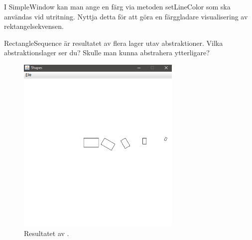 \Subtask I SimpleWindow kan man ange en färg via metoden setLineColor som ska användas vid utritning. Nyttja detta för att göra en färggladare visualisering av rektangelsekvensen.

\Subtask RectangleSequence är resultatet av flera lager utav abstraktioner. Vilka abstraktionslager ser du? Skulle man kunna abstrahera ytterligare?



\begin{figure}[H]
\centering
\includegraphics[width=0.7\textwidth, height = 0.3\pdfpageheight, keepaspectratio]{../img/w06-lab/RollingRectangle.png}
\caption {Resultatet av \newline {}.}
\label{fig:classes:turtlegraphics:rollingrectangle}
\end{figure}


